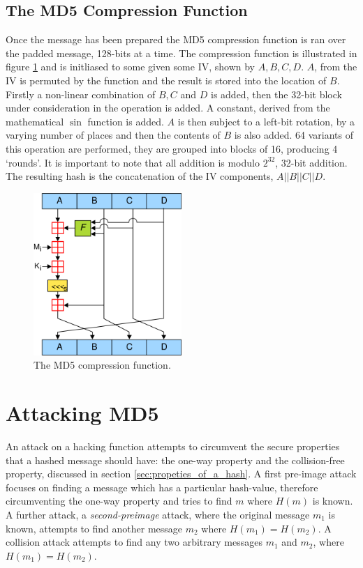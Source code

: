 \documentclass[a4paper,12pt]{article}
\newcommand{\hash}[1]{\ensuremath{H(#1)}}
\begin{document}
\subsection{The MD5 Compression Function}
Once the message has been prepared the MD5 compression function is ran over the padded message, 128-bits at a time. The compression function is illustrated in figure \ref{fig:md5comp} and is initliased to some given some IV, shown by $A, B, C, D$. $A$, from the IV is permuted by the function and the result is stored into the location of $B$. Firstly a non-linear combination of $B, C$ and $D$ is added, then the 32-bit block under consideration in the operation is added. A constant, derived from the mathematical $\sin$ function is added. $A$ is then subject to a left-bit rotation, by a varying number of places and then the contents of $B$ is also added. 64 variants of this operation are performed, they are grouped into blocks of 16, producing 4 `rounds'. It is important to note that all addition is modulo $2^{32}$, 32-bit addition.
The resulting hash is the concatenation of the IV components, $A || B || C || D$.
\begin{figure}
    \centering
    \includegraphics[width=0.5\textwidth]{md5.png}
    \caption{The MD5 compression function.}
    \label{fig:md5comp}
\end{figure}

\section{Attacking MD5}
An attack on a hacking function attempts to circumvent the secure properties that a hashed message should have: the one-way property and the collision-free property, discussed in section \ref{sec:propeties_of_a_hash}.
A first pre-image attack focuses on finding a message which has a particular hash-value, therefore circumventing the one-way property and tries to find $m$ where $\hash{m}$ is known. A further attack, a \emph{second-preimage} attack, where the original message $m_1$ is known, attempts to find another message $m_2$ where $\hash{m_1} = \hash{m_2}$.
A collision attack attempts to find any two arbitrary messages $m_1$ and $m_2$, where $\hash{m_1} = \hash{m_2}$.
\end{document}
